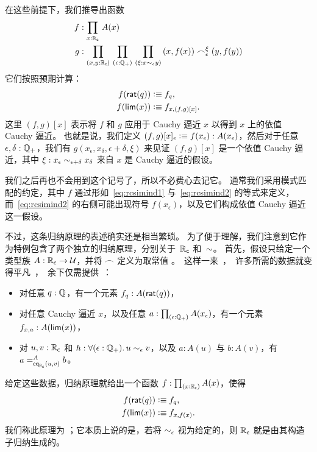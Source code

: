 在这些前提下，我们推导出函数
\begin{align*}
  f&:\prd{x:\RC} A(x)\\
  g&:\prd{x,y:\RC}{\epsilon:\Qp}{\xi:x\close{\epsilon} y}
  (x,f(x)) \bsim_\epsilon^\xi (y,f(y))
\end{align*}
它们按照预期计算：
\begin{align}
  f(\rcrat(q)) &\defeq f_q, \label{eq:rcsimind1}\\
  f(\rclim(x)) &\defeq f_{x,(f,g)[x]}. \label{eq:rcsimind2}
\end{align}
这里 $(f,g)[x]$ 表示将 $f$ 和 $g$ 应用于 Cauchy 逼近 $x$ 以得到 $x$ 上的依值 Cauchy 逼近。
也就是说，我们定义 $(f,g)[x]_\epsilon \defeq f(x_\epsilon) : A(x_\epsilon)$，然后对于任意 $\epsilon,\delta:\Qp$，我们有 $g(x_\epsilon,x_\delta,\epsilon+\delta,\xi)$ 来见证 $(f,g)[x]$ 是一个依值 Cauchy 逼近，其中 $\xi: x_\epsilon \close{\epsilon+\delta} x_\delta$ 来自 $x$ 是 Cauchy 逼近的假设。

我们之后再也不会用到这个记号了，所以不必费心去记它。
通常我们采用模式匹配的约定，其中 $f$ 通过形如~\eqref{eq:rcsimind1} 与~\eqref{eq:rcsimind2} 的等式来定义，而~\eqref{eq:rcsimind2} 的右侧可能出现符号 $f(x_\epsilon)$，以及它们构成依值 Cauchy 逼近这一假设。

不过，这条归纳原理的表述确实还是相当繁琐。
为了便于理解，我们注意到它作为特例包含了两个独立的归纳原理，分别关于~$\RC$ 和~$\closesym$。
首先，假设只给定一个类型族 $A:\RC\to\type$，并将 $\bsim$ 定义为取常值 \unit。
这样一来，许多所需的数据就变得平凡，余下仅需提供：

\begin{itemize}
\item 对任意 $q : \Q$，有一个元素 $f_q:A(\rcrat(q))$，
\item 对任意 Cauchy 逼近 $x$，以及任意 $a:\prd{\epsilon:\Qp} A(x_\epsilon)$，有一个元素 $f_{x,a}:A(\rclim(x))$，
\item 对 $u, v : \RC$ 和 $h:\fall{\epsilon : \Qp} u \close\epsilon v$，以及 $a:A(u)$ 与 $b:A(v)$，有 $\dpath{A}{\rceq(u,v)}{a}{b}$。
\end{itemize}

给定这些数据，归纳原理就给出一个函数 $f:\prd{x:\RC} A(x)$，使得
\begin{align*}
  f(\rcrat(q)) &\defeq f_q,\\
  f(\rclim(x)) &\defeq f_{x,f(x)}.
\end{align*}
我们称此原理为 ；它本质上说的是，若将 $\close\epsilon$ 视为给定的，则 $\RC$ 就是由其构造子归纳生成的。

